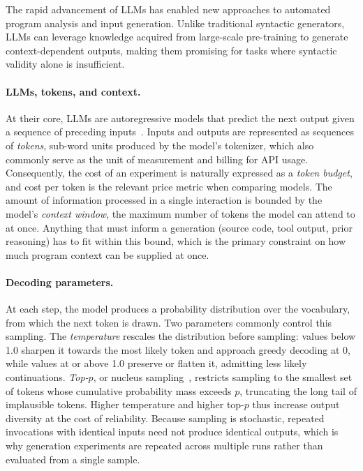 The rapid advancement of \acp{LLM} has enabled new approaches to automated
program analysis and input generation. Unlike traditional syntactic generators,
\acp{LLM} can leverage knowledge acquired from large-scale pre-training to
generate context-dependent outputs, making them promising for tasks where
syntactic validity alone is insufficient.

\paragraph{LLMs, tokens, and context.}
At their core, \acp{LLM} are autoregressive models that predict the next output
given a sequence of preceding inputs~\cite{brownLanguageModelsAre2020}. Inputs
and outputs are represented as sequences of \emph{tokens}, sub-word units
produced by the model's tokenizer, which also commonly serve as the unit of
measurement and billing for \ac{API} usage. Consequently, the cost of an
experiment is naturally expressed as a \emph{token budget}, and cost per token
is the relevant price metric when comparing models. The amount of information
processed in a single interaction is bounded by the model's \emph{context
window}, the maximum number of tokens the model can attend to at once. Anything
that must inform a generation (source code, tool output, prior reasoning) has
to fit within this bound, which is the primary constraint on how much program
context can be supplied at once.

\paragraph{Decoding parameters.}
At each step, the model produces a probability distribution over the vocabulary,
from which the next token is drawn. Two parameters commonly control this
sampling. The \emph{temperature} rescales the distribution before sampling:
values below \num{1.0} sharpen it towards the most likely token and approach
greedy decoding at \num{0}, while values at or above \num{1.0} preserve or
flatten it, admitting less likely continuations. \emph{Top-$p$}, or nucleus
sampling~\cite{holtzmanCuriousCaseNeural2020}, restricts sampling to the
smallest set of tokens whose cumulative probability mass exceeds $p$, truncating
the long tail of implausible tokens. Higher temperature and higher top-$p$ thus
increase output diversity at the cost of reliability. Because sampling is
stochastic, repeated invocations with identical inputs need not produce
identical outputs, which is why generation experiments are repeated across
multiple runs rather than evaluated from a single sample.

